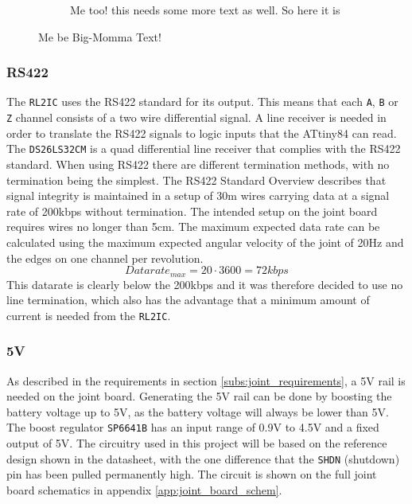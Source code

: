 \begin{figure}[H]
\begin{minipage}{.4\linewidth}
\begin{subfigure}[b]{\linewidth}
			\caption{Me too! this needs some more text as well. So here it is}
			\label{sfig:readside_2}
		\end{subfigure}
	\end{minipage}
	\caption{Me be Big-Momma Text!}
	\label{fig:mechdesign}
\end{figure}

\subsubsection{RS422}
The \texttt{RL2IC} uses the RS422 standard for its output.
This means that each \texttt{A}, \texttt{B} or \texttt{Z} channel consists of a two wire differential signal.
A line receiver is needed in order to translate the RS422 signals to logic inputs that the ATtiny84 can read.
The \texttt{DS26LS32CM} is a quad differential line receiver that complies with the RS422 standard.  
When using RS422 there are different termination methods, with no termination being the simplest.
The RS422 Standard Overview \cite{rs422_texas} describes that signal integrity is maintained in a setup of \approx 30m wires carrying data at a signal rate of 200kbps without termination.
The intended setup on the joint board requires wires no longer than 5cm.
The maximum expected data rate can be calculated using the maximum expected angular velocity of the joint of 20Hz and the edges on one channel per revolution.
\begin{equation}
Datarate_{max}	= 20 \cdot 3600 = 72kbps
\end{equation}
This datarate is clearly below the 200kbps and it was therefore decided to use no line termination, which also has the advantage that a minimum amount of current is needed from the \texttt{RL2IC}.


\subsubsection{5V}
As described in the requirements in section \ref{subs:joint_requirements}, a 5V rail is needed on the joint board.
Generating the 5V rail can be done by boosting the battery voltage up to 5V, as the battery voltage will always be lower than 5V.
The boost regulator \texttt{SP6641B} \cite{sp6641b} has an input range of 0.9V to 4.5V and a fixed output of 5V.
The circuitry used in this project will be based on the reference design shown in the datasheet, with the one difference that the \texttt{SHDN} (shutdown) pin has been pulled permanently high.
The circuit is shown on the full joint board schematics in appendix \ref{app:joint_board_schem}.

